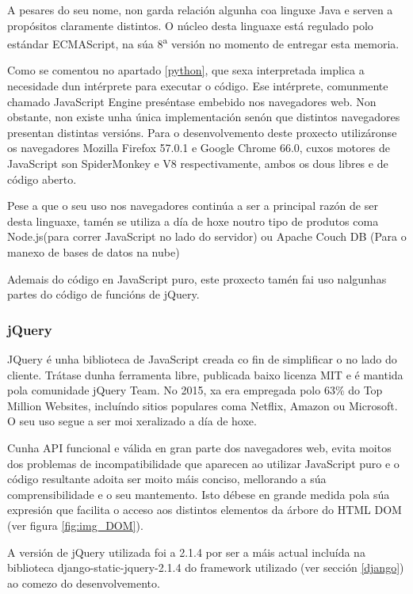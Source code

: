 A pesares do seu nome, non garda relación algunha coa linguxe Java e serven a propósitos claramente distintos. O núcleo desta linguaxe está regulado polo estándar ECMAScript\textregistered, na súa 8\textsuperscript{a} versión\cite{ecma} no momento de entregar esta memoria. 

Como se comentou no apartado \ref{python}, que sexa interpretada implica a necesidade dun intérprete para executar o código. Ese intérprete, comunmente chamado JavaScript Engine preséntase embebido nos navegadores web. Non obstante, non existe unha única implementación senón que distintos navegadores presentan distintas versións. Para o desenvolvemento deste proxecto utilizáronse os navegadores Mozilla Firefox 57.0.1 e Google Chrome 66.0, cuxos motores de JavaScript son SpiderMonkey e V8 respectivamente\cite{javascript1}, ambos os dous libres e de código aberto.

Pese a que o seu uso nos navegadores continúa a ser a principal razón de ser desta linguaxe, tamén se utiliza a día de hoxe noutro tipo de produtos coma Node.js(para correr JavaScript no lado do servidor) ou Apache Couch DB (Para o manexo de bases de datos na nube)\cite{javascript2} 

Ademais do código en JavaScript puro, este proxecto tamén fai uso nalgunhas partes do código de funcións de jQuery.

\subsubsection{jQuery}

JQuery é unha biblioteca de JavaScript creada co fin de simplificar o  no lado do cliente. Trátase dunha ferramenta libre, publicada baixo licenza MIT e é mantida pola comunidade jQuery Team. No 2015, xa era empregada polo 63\% do Top Million Websites\cite{jquery}, incluíndo sitios populares coma Netflix, Amazon ou Microsoft. O seu uso segue a ser moi xeralizado a día de hoxe.  

Cunha API funcional e válida en gran parte dos navegadores web, evita moitos dos problemas de incompatibilidade que aparecen ao utilizar JavaScript puro e o código resultante adoita ser moito máis conciso, mellorando a súa comprensibilidade e o seu mantemento. Isto débese en grande medida pola súa expresión  que facilita o acceso aos distintos elementos da árbore do HTML DOM (ver figura \ref{fig:img_DOM}). 

A versión de jQuery utilizada foi a 2.1.4 por ser a máis actual incluída na biblioteca django-static-jquery-2.1.4\cite{dj-jquery} do framework utilizado (ver sección \ref{django}) ao comezo do desenvolvemento.



